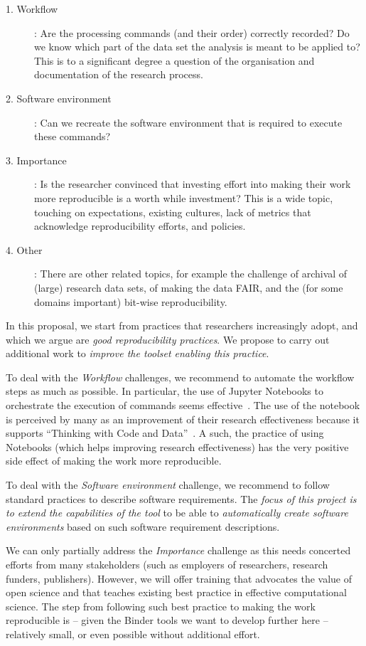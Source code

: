 \begin{description}
\item[1. Workflow]: Are the processing commands (and their order)
correctly recorded? Do we know which part of the data set the analysis is meant
to be applied to? This is to a significant degree a question of the organisation
and documentation of the research process.

\item[2. Software environment]: Can we recreate the software environment that is
required to execute these commands?

\item[3. Importance]: Is the researcher convinced that investing effort into making
their work more reproducible is a worth while investment? This is a wide topic,
touching on expectations, existing cultures, lack of metrics that acknowledge
reproducibility efforts, and policies.

\item[4. Other]: There are other related topics, for example the challenge of
archival of (large) research data sets, of making the data FAIR, and the (for
some domains important) bit-wise reproducibility.
\end{description}

In this proposal, we start from practices that researchers increasingly adopt,
and which we argue are \emph{good reproducibility practices}. We propose to carry
out additional work to \emph{improve the toolset enabling this practice}.

To deal with the \emph{Workflow} challenges, we recommend to automate the
workflow steps as much as possible. In particular, the use of Jupyter Notebooks
to orchestrate the execution of commands seems effective~\cite{Beg2021}.
The use of the notebook is
perceived by many as an improvement of their research effectiveness because
it supports ``Thinking with Code and Data''~\cite{Granger2021}. A such, the
practice of using Notebooks (which helps improving research effectiveness) has
the very positive side effect of making the work more reproducible.


To deal with the \emph{Software environment} challenge, we recommend to follow
standard practices to describe software requirements. The \emph{focus of this
project is to extend the capabilities of the \repotodocker{} tool} to be able to
\emph{automatically create software environments} based on such software
requirement descriptions.

We can only partially address the \emph{Importance} challenge as this needs
concerted efforts from many stakeholders (such as employers of researchers,
research funders, publishers). However, we will offer training that advocates
the value of open science and that teaches existing best practice in 
effective computational science. The step from following such best practice to
making the work reproducible is -- given the Binder tools we want to develop
further here -- relatively small, or even possible without additional effort.

